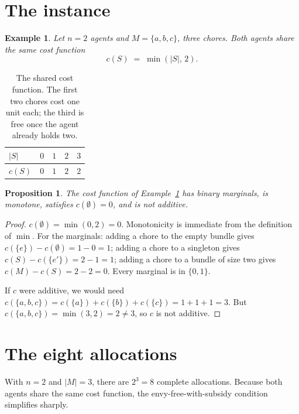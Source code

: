 \documentclass[11pt]{article}
\newtheorem{example}[definition]{Example}
\newtheorem{proposition}[definition]{Proposition}
\newcommand{\Mset}{M}
\begin{document}
\section{The instance}
\label{sec:instance}

\begin{example}
\label{ex:main}
Let $n = 2$ agents and $\Mset = \{a,b,c\}$, three chores. Both agents share
the same cost function
\[
  c(S) \;=\; \min(|S|,\,2).
\]
\end{example}

\begin{table}[h]
\centering
\begin{tabular}{@{}lcccc@{}}
\toprule
$|S|$ & $0$ & $1$ & $2$ & $3$ \\
\midrule
$c(S)$ & $0$ & $1$ & $2$ & $2$ \\
\bottomrule
\end{tabular}
\caption{The shared cost function. The first two chores cost one unit each;
the third is free once the agent already holds two.}
\label{tab:cost}
\end{table}

\begin{proposition}
\label{prop:inclass}
The cost function of Example~\ref{ex:main} has binary marginals, is
monotone, satisfies $c(\emptyset)=0$, and is \emph{not} additive.
\end{proposition}

\begin{proof}
$c(\emptyset) = \min(0,2) = 0$. Monotonicity is immediate from the definition
of $\min$. For the marginals: adding a chore to the empty bundle gives
$c(\{e\}) - c(\emptyset) = 1 - 0 = 1$; adding a chore to a singleton gives
$c(S) - c(\{e'\}) = 2 - 1 = 1$; adding a chore to a bundle of size two gives
$c(\Mset) - c(S) = 2 - 2 = 0$. Every marginal is in $\{0,1\}$.

If $c$ were additive, we would need $c(\{a,b,c\}) = c(\{a\}) + c(\{b\}) +
c(\{c\}) = 1+1+1 = 3$. But $c(\{a,b,c\}) = \min(3,2) = 2 \ne 3$, so $c$ is not
additive.
\end{proof}

\section{The eight allocations}
\label{sec:eight}

With $n=2$ and $|\Mset|=3$, there are $2^3 = 8$ complete allocations. Because
both agents share the same cost function, the envy-free-with-subsidy
condition simplifies sharply.
\end{document}
